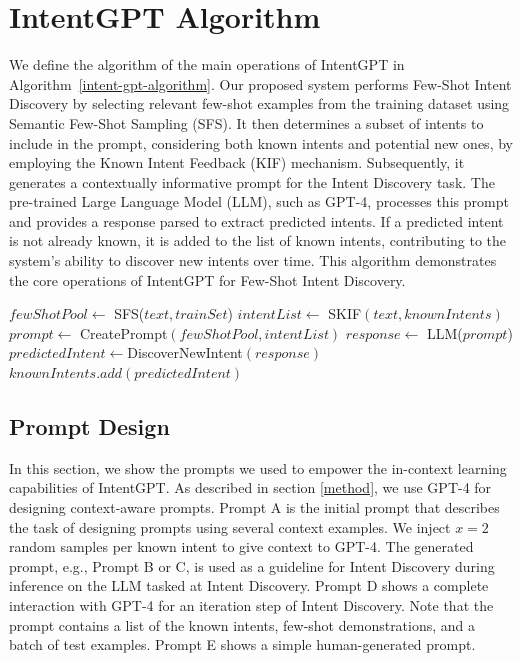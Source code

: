 \documentclass[11pt]{article}
\begin{document}
\section{IntentGPT Algorithm} \label{algorithm}
We define the algorithm of the main operations of IntentGPT in Algorithm~\ref{intent-gpt-algorithm}. Our proposed system performs Few-Shot Intent Discovery by selecting relevant few-shot examples from the training dataset using Semantic Few-Shot Sampling (SFS). It then determines a subset of intents to include in the prompt, considering both known intents and potential new ones, by employing the Known Intent Feedback (KIF) mechanism. Subsequently, it generates a contextually informative prompt for the Intent Discovery task. The pre-trained Large Language Model (LLM), such as GPT-4, processes this prompt and provides a response parsed to extract predicted intents. If a predicted intent is not already known, it is added to the list of known intents, contributing to the system's ability to discover new intents over time. This algorithm demonstrates the core operations of IntentGPT for Few-Shot Intent Discovery.
\begin{algorithm*}[ht]
\caption{Few Shot Intent Discovery Algorithm}
\label{alg:text_inference}
\begin{algorithmic}[1]
\State $fewShotPool \gets $ SFS($text, trainSet$) 
\State $intentList \gets$ SKIF$(text, knownIntents)$ 
\State $prompt \gets$ CreatePrompt$(fewShotPool, intentList)$ 
\State $response \gets$ LLM($prompt$)
\State $predictedIntent \gets $DiscoverNewIntent$(response)$ 
 
    \State $knownIntents.add(predictedIntent)$
\EndIf
\EndProcedure
\end{algorithmic}
\label{intent-gpt-algorithm}
\end{algorithm*}
\subsection{Prompt Design} \label{prompt-design}
\renewcommand\lstlistingname{Prompt}

In this section, we show the prompts we used to empower the in-context learning capabilities of IntentGPT. As described in section \ref{method}, we use GPT-4 for designing context-aware prompts. Prompt A is the initial prompt that describes the task of designing prompts using several context examples. We inject $x=2$ random samples per known intent to give context to GPT-4. The generated prompt, e.g., Prompt B or C, is used as a guideline for Intent Discovery during inference on the LLM tasked at Intent Discovery. Prompt D shows a complete interaction with GPT-4 for an iteration step of Intent Discovery. Note that the prompt contains a list of the known intents, few-shot demonstrations, and a batch of test examples. Prompt E shows a simple human-generated prompt.
\end{document}

